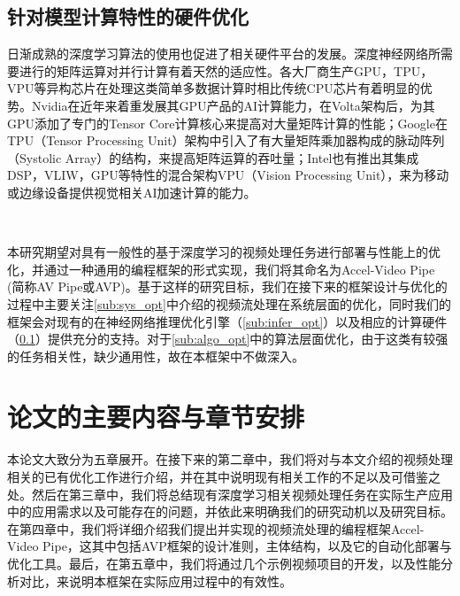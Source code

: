 \subsection{针对模型计算特性的硬件优化}\label{sub:HW_opt}
日渐成熟的深度学习算法的使用也促进了相关硬件平台的发展。深度神经网络所需要进行的矩阵运算对并行计算有着天然的适应性。各大厂商生产GPU，TPU，VPU等异构芯片在处理这类简单多数据计算时相比传统CPU芯片有着明显的优势。Nvidia在近年来着重发展其GPU产品的AI计算能力，在Volta架构后，为其GPU添加了专门的Tensor Core计算核心来提高对大量矩阵计算的性能；Google在TPU\cite{jouppi2017datacenter}（Tensor Processing Unit）架构中引入了有大量矩阵乘加器构成的脉动阵列（Systolic Array）的结构，来提高矩阵运算的吞吐量；Intel也有推出其集成DSP，VLIW，GPU等特性的混合架构VPU\cite{moloney2014myriad}（Vision Processing Unit），来为移动或边缘设备提供视觉相关AI加速计算的能力。\par~\par

本研究期望对具有一般性的基于深度学习的视频处理任务进行部署与性能上的优化，并通过一种通用的编程框架的形式实现，我们将其命名为Accel-Video Pipe (简称AV Pipe或AVP)。基于这样的研究目标，我们在接下来的框架设计与优化的过程中主要关注\ref{sub:sys_opt}中介绍的视频流处理在系统层面的优化，同时我们的框架会对现有的在神经网络推理优化引擎（\ref{sub:infer_opt}）以及相应的计算硬件（\ref{sub:HW_opt}）提供充分的支持。对于\ref{sub:algo_opt}中的算法层面优化，由于这类有较强的任务相关性，缺少通用性，故在本框架中不做深入。

\section{论文的主要内容与章节安排}
本论文大致分为五章展开。在接下来的第二章中，我们将对与本文介绍的视频处理相关的已有优化工作进行介绍，并在其中说明现有相关工作的不足以及可借鉴之处。然后在第三章中，我们将总结现有深度学习相关视频处理任务在实际生产应用中的应用需求以及可能存在的问题，并依此来明确我们的研究动机以及研究目标。
在第四章中，我们将详细介绍我们提出并实现的视频流处理的编程框架Accel-Video Pipe，这其中包括AVP框架的设计准则，主体结构，以及它的自动化部署与优化工具。最后，在第五章中，我们将通过几个示例视频项目的开发，以及性能分析对比，来说明本框架在实际应用过程中的有效性。
